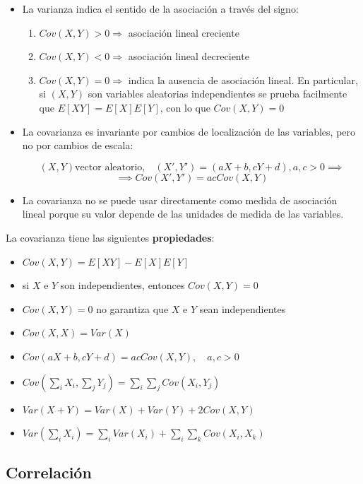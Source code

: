 \documentclass{article}
\begin{document}
\begin{itemize}
    \item La varianza indica el sentido de la asociación a través del signo:
    \begin{enumerate}
        \item $Cov(X, Y) > 0 \Rightarrow$ asociación lineal creciente
        \item $Cov(X, Y) < 0 \Rightarrow$ asociación lineal decreciente
        \item $Cov(X, Y) = 0 \Rightarrow$ indica la ausencia de asociación lineal. En particular, si $(X, Y)$ son variables aleatorias independientes
                se prueba facilmente que $E[XY] = E[X]E[Y]$, con lo que $Cov(X, Y) = 0$
    \end{enumerate}
    \item La covarianza es invariante por cambios de localización de las variables, pero no por cambios de escala:
     
    \[ (X, Y) \text{vector aleatorio,} \quad (X', Y') = (aX + b, cY + d), a, c > 0 \implies \]
    \[ \implies Cov(X', Y') = acCov(X, Y) \]

    \item La covarianza no se puede usar directamente como medida de asociación lineal porque su valor depende de las unidades de medida de las variables.
\end{itemize}

La covarianza tiene las siguientes \textbf{propiedades}:
\begin{itemize}
    \item $Cov(X, Y) = E[XY] - E[X]E[Y]$
    \item si $X$ e $Y$ son independientes, entonces $Cov(X, Y) = 0$
    \item $Cov(X, Y) = 0$ no garantiza que $X$ e $Y$ sean independientes
    \item $Cov(X, X) = Var(X)$
    \item $Cov(aX + b, cY + d) = acCov(X, Y),\quad a, c >0$
    \item $Cov(\sum_{i}X_i, \sum_{j}Y_j) = \sum_{i}\sum_{j}Cov(X_i, Y_j)$
    \item $Var(X + Y) = Var(X) + Var(Y) + 2Cov(X, Y)$
    \item $Var(\sum_{i}X_i) = \sum_{i}Var(X_i) + \sum_i\sum_kCov(X_i, X_k)$
\end{itemize}

\newpage

\subsection{Correlación}
\end{document}
